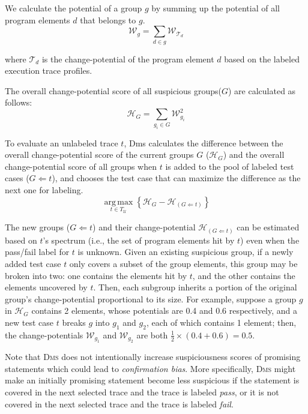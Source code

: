 We calculate the potential of a group $g$ by summing up the potential of all program elements $d$ that
belongs to $g$.
\begin{equation}
	\mathcal{W}_{g} = \sum\limits_{d \in g}\mathcal{W}_{\mathcal{T}_{d}}\label{eq:elem_potential}
\end{equation}

where $\mathcal{T}_{d}$ is the change-potential of the program element $d$ based on the labeled execution trace profiles.

The overall change-potential score of all suspicious groups($G$) are calculated as follows:
\begin{equation}
	\mathcal{H}_G = \sum\limits_{g_{i} \in G}{ \mathcal{W}_{g_i}^{2} }\label{eq:groupset_potential}
\end{equation}

To evaluate an unlabeled trace $t$, {\sc Dms} calculates the difference between the overall change-potential score of the current groups $G$ ($\mathcal{H}_G$) and the overall change-potential score of all groups when $t$ is added to the pool of labeled test cases ($G \Leftarrow t$), and chooses the test case that can maximize the difference as the next one for labeling.
\begin{equation}
	\operatorname*{arg\,max}_{t \in T_\mathcal{U}} \left\{ \mathcal{H}_G - \mathcal{H}_{(G \Leftarrow t)} \right\}\label{eq:select_metric}
\end{equation}

The new groups ($G \Leftarrow t$) and their change-potential $\mathcal{H}_{(G \Leftarrow t)}$ can be estimated based on $t$'s spectrum (i.e., the set of program elements hit by $t$) even when the pass/fail label for $t$ is unknown. Given an existing suspicious group, if a newly added test case $t$ only covers a subset of the group elements, this group may be broken into two: one contains the elements hit by $t$, and the other contains the elements uncovered by $t$. Then, each subgroup inherits a portion of the original group's change-potential proportional to its size. For example, suppose a group $g$ in $\mathcal{H}_{G}$ contains 2 elements, whose potentials are 0.4 and 0.6 respectively, and a new test case $t$ breaks $g$ into $g_{1}$ and $g_{2}$, each of which contains 1 element; then, the change-potentials $\mathcal{W}_{g_1}$ and $\mathcal{W}_{g_2}$ are both $\frac{1}{2}\times(0.4+0.6) = 0.5$.

Note that \textsc{Dms} does not intentionally increase suspiciousness scores of promising statements which could lead to {\em confirmation bias}. More specifically, \textsc{Dms} might make an initially promising statement become less suspicious if the statement is covered in the next selected trace and the trace is labeled {\em pass}, or it is not covered in the next selected trace and the trace is labeled {\em fail}.


